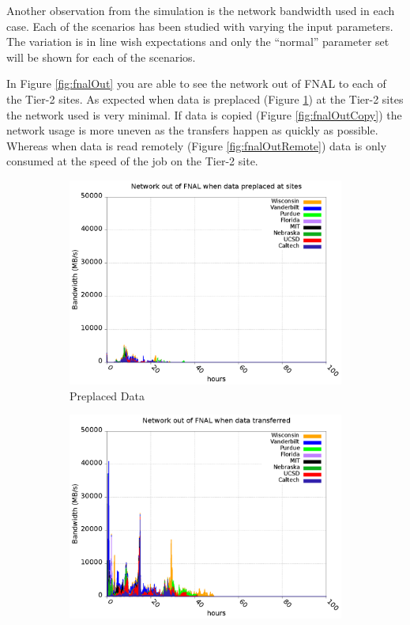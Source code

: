 \documentclass[a4paper]{jpconf}
\begin{document}
Another observation from the simulation is the network bandwidth used
in each case. Each of the scenarios has been studied with varying the
input parameters. The variation is in line wish expectations and only
the ``normal'' parameter set will be shown for each of the scenarios.

In Figure \ref{fig:fnalOut} you are able to see the network out of
FNAL to each of the Tier-2 sites. As expected when data is preplaced
(Figure \ref{fig:fnalOutToday}) at the Tier-2 sites the network used
is very minimal. If data is copied (Figure \ref{fig:fnalOutCopy}) the
network usage is more uneven as the transfers happen as quickly as
possible. Whereas when data is read remotely (Figure
\ref{fig:fnalOutRemote}) data is only consumed at the speed of the job
on the Tier-2 site.

\begin{figure}
  \centering
  \begin{subfigure}{0.3\textwidth}
    \includegraphics[width=\textwidth]{figures/T_FP0_RP0Data.png}
    \caption{Preplaced Data\label{fig:fnalOutToday}}
  \end{subfigure}
  \begin{subfigure}{0.3\textwidth}
    \includegraphics[width=\textwidth]{figures/S_FP0_RP0Data.png}

\end{subfigure}
\end{figure}
\end{document}
